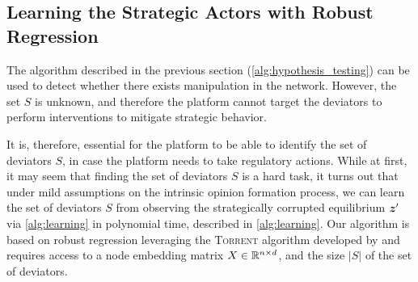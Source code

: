 



\subsection{Learning the Strategic Actors with Robust Regression} \label{sec:learning_regression}

The algorithm described in the previous section (\cref{alg:hypothesis_testing}) can be used to detect whether there exists manipulation in the network. However, the set $S$ is unknown, and therefore the platform cannot target the deviators to perform interventions to mitigate strategic behavior.  

It is, therefore, essential for the platform to be able to identify the set of deviators $S$, in case the platform needs to take regulatory actions. While at first, it may seem that finding the set of deviators $S$ is a hard task, it turns out that under mild assumptions on the intrinsic opinion formation process, we can learn the set of deviators $S$ from observing the strategically corrupted equilibrium $\bm{z}^\prime$ via \cref{alg:learning} in polynomial time, described in \cref{alg:learning}. Our algorithm is based on robust regression leveraging the \textsc{Torrent} algorithm developed by \citet{torrent-2015} and requires access to a node embedding matrix $X \in \mathbb{R}^{n \times d}$, and the size $|S|$ of the set of deviators. 

